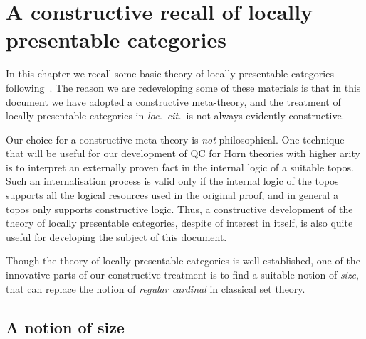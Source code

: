 \chapter{A constructive recall of locally presentable categories}\label{ch:lp}

In this chapter we recall some basic theory of locally presentable categories following~\citet{adamek1994locally}. The reason we are redeveloping some of these materials is that in this document we have adopted a constructive meta-theory, and the treatment of locally presentable categories in \emph{loc.\ cit.}\ is not always evidently constructive. 

Our choice for a constructive meta-theory is \emph{not} philosophical. One technique that will be useful for our development of \gls{QC} for Horn theories with higher arity is to interpret an externally proven fact in the internal logic of a suitable topos. Such an internalisation process is valid only if the internal logic of the topos supports all the logical resources used in the original proof, and in general a topos only supports constructive logic. Thus, a constructive development of the theory of locally presentable categories, despite of interest in itself, is also quite useful for developing the subject of this document.

Though the theory of locally presentable categories is well-established, one of the innovative parts of our constructive treatment is to find a suitable notion of \emph{size}, that can replace the notion of \emph{regular cardinal} in classical set theory.

\section{A notion of size}\label{sec:size}

